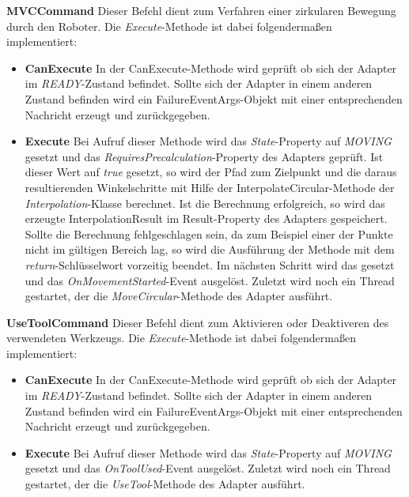 \textbf{MVCCommand}
\newline
Dieser Befehl dient zum Verfahren einer zirkularen Bewegung durch den Roboter. Die \textit{Execute}-Methode ist dabei folgendermaßen implementiert:
\begin{itemize}
\item \textbf{CanExecute}
\newline
In der CanExecute-Methode wird geprüft ob sich der Adapter im \textit{READY}-Zustand befindet. Sollte sich der Adapter in einem anderen Zustand befinden wird ein FailureEventArgs-Objekt mit einer entsprechenden Nachricht erzeugt und zurückgegeben.
\item \textbf{Execute}
\newline
Bei Aufruf dieser Methode wird das \textit{State}-Property auf \textit{MOVING} gesetzt und das \textit{RequiresPrecalculation}-Property des Adapters geprüft. Ist dieser Wert auf \textit{true} gesetzt, so wird der Pfad zum Zielpunkt und die daraus resultierenden Winkelschritte mit Hilfe der InterpolateCircular-Methode der \textit{Interpolation}-Klasse berechnet. Ist die Berechnung erfolgreich, so wird das erzeugte InterpolationResult im Result-Property des Adapters gespeichert. Sollte die Berechnung fehlgeschlagen sein, da zum Beispiel einer der Punkte nicht im gültigen Bereich lag, so wird die Ausführung der Methode mit dem \textit{return}-Schlüsselwort vorzeitig beendet. Im nächsten Schritt wird das  gesetzt und das \textit{OnMovementStarted}-Event ausgelöst. Zuletzt wird noch ein Thread gestartet, der die \textit{MoveCircular}-Methode des Adapter ausführt.
\end{itemize}

\textbf{UseToolCommand}
\newline
Dieser Befehl dient zum Aktivieren oder Deaktiveren des verwendeten Werkzeugs. Die \textit{Execute}-Methode ist dabei folgendermaßen implementiert:
\begin{itemize}
\item \textbf{CanExecute}
\newline
In der CanExecute-Methode wird geprüft ob sich der Adapter im \textit{READY}-Zustand befindet. Sollte sich der Adapter in einem anderen Zustand befinden wird ein FailureEventArgs-Objekt mit einer entsprechenden Nachricht erzeugt und zurückgegeben.
\item \textbf{Execute}
\newline
Bei Aufruf dieser Methode wird das \textit{State}-Property auf \textit{MOVING} gesetzt und das \textit{OnToolUsed}-Event ausgelöst. Zuletzt wird noch ein Thread gestartet, der die \textit{UseTool}-Methode des Adapter ausführt. 
\end{itemize}


